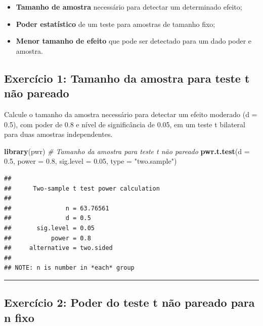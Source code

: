 \documentclass[
]{book}
\newenvironment{Shaded}{\begin{snugshade}}{\end{snugshade}}
\newcommand{\AttributeTok}[1]{\textcolor[rgb]{0.13,0.29,0.53}{#1}}
\newcommand{\CommentTok}[1]{\textcolor[rgb]{0.56,0.35,0.01}{\textit{#1}}}
\newcommand{\FloatTok}[1]{\textcolor[rgb]{0.00,0.00,0.81}{#1}}
\newcommand{\FunctionTok}[1]{\textcolor[rgb]{0.13,0.29,0.53}{\textbf{#1}}}
\newcommand{\NormalTok}[1]{#1}
\newcommand{\StringTok}[1]{\textcolor[rgb]{0.31,0.60,0.02}{#1}}
\providecommand{\tightlist}{%
  \setlength{\itemsep}{0pt}\setlength{\parskip}{0pt}}
\begin{document}
\begin{itemize}
\tightlist
\item
  \textbf{Tamanho de amostra} necessário para detectar um determinado efeito;
\item
  \textbf{Poder estatístico} de um teste para amostras de tamanho fixo;
\item
  \textbf{Menor tamanho de efeito} que pode ser detectado para um dado poder e amostra.
\end{itemize}

\subsection{Exercício 1: Tamanho da amostra para teste t não pareado}\label{exercuxedcio-1-tamanho-da-amostra-para-teste-t-nuxe3o-pareado}

Calcule o tamanho da amostra necessário para detectar um efeito moderado (d = 0.5), com poder de 0.8 e nível de significância de 0.05, em um teste t bilateral para duas amostras independentes.

\begin{Shaded}
\begin{Highlighting}[]
\FunctionTok{library}\NormalTok{(pwr)}
\CommentTok{\# Tamanho da amostra para teste t não pareado}
\FunctionTok{pwr.t.test}\NormalTok{(}\AttributeTok{d =} \FloatTok{0.5}\NormalTok{, }\AttributeTok{power =} \FloatTok{0.8}\NormalTok{, }\AttributeTok{sig.level =} \FloatTok{0.05}\NormalTok{, }\AttributeTok{type =} \StringTok{"two.sample"}\NormalTok{)}
\end{Highlighting}
\end{Shaded}

\begin{verbatim}
## 
##      Two-sample t test power calculation 
## 
##               n = 63.76561
##               d = 0.5
##       sig.level = 0.05
##           power = 0.8
##     alternative = two.sided
## 
## NOTE: n is number in *each* group
\end{verbatim}

\begin{center}\rule{0.5\linewidth}{0.5pt}\end{center}

\subsection{Exercício 2: Poder do teste t não pareado para n fixo}\label{exercuxedcio-2-poder-do-teste-t-nuxe3o-pareado-para-n-fixo}
\end{document}
